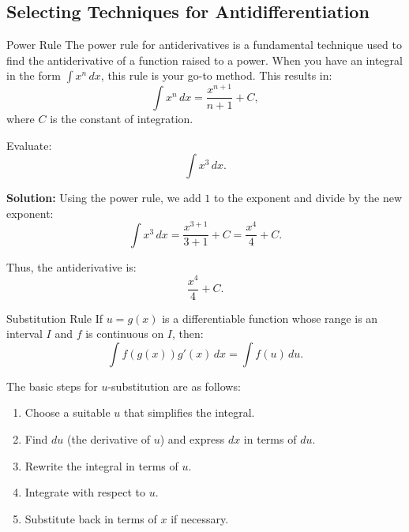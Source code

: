 \documentclass[12pt]{article}
\theoremstyle{beautifulthm}
\begin{document}
\subsection{Selecting Techniques for Antidifferentiation}

\begin{mytheorem}{Power Rule}{}
    The power rule for antiderivatives is a fundamental technique used to find the antiderivative of a function raised to a power. When you have an integral in the form $\int x^n \, dx$, this rule is your go-to method.
\vspace{3mm}
This results in:
\[
\int x^n \, dx = \frac{x^{n+1}}{n+1} + C,
\]
where $C$ is the constant of integration.
\end{mytheorem}

\begin{tcolorbox}[colback=examplebg, colframe=red!75!black, title=\textbf{EXAMPLE 1: Find the Integral of the Function}, fonttitle=\bfseries, sharp corners]
Evaluate:
\[
\int x^3 \, dx.
\]


\tcblower
\textbf{Solution:} 
Using the power rule, we add $1$ to the exponent and divide by the new exponent:
\[
\int x^3 \, dx = \frac{x^{3+1}}{3+1} + C = \frac{x^4}{4} + C.
\]

Thus, the antiderivative is:
\[
\frac{x^4}{4} + C.
\]

\end{tcolorbox}

\begin{mytheorem}{Substitution Rule}{}
    If $u = g(x)$ is a differentiable function whose range is an interval $I$ and $f$ is continuous on $I$, then:
\[
\int f(g(x)) g'(x) \, dx = \int f(u) \, du.
\]


The basic steps for \( u \)-substitution are as follows:
\begin{enumerate}
    \item Choose a suitable \( u \) that simplifies the integral.
    \item Find \( du \) (the derivative of \( u \)) and express \( dx \) in terms of \( du \).
    \item Rewrite the integral in terms of \( u \).
    \item Integrate with respect to \( u \).
    \item Substitute back in terms of \( x \) if necessary.
\end{enumerate}
\end{mytheorem}
\end{document}
